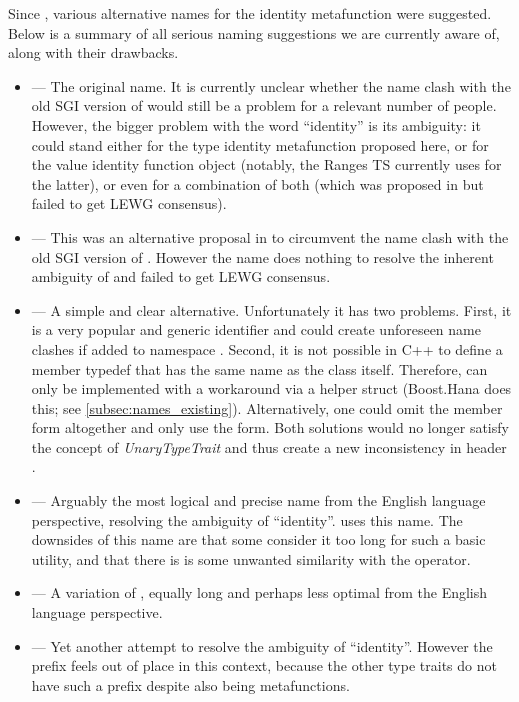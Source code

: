 Since \cite{N3766}, various alternative names for the identity metafunction were suggested. Below is a summary of all serious naming suggestions we are currently aware of, along with their drawbacks.
\begin{itemize}
\item {} --- The original name. It is currently unclear whether the name clash with the old SGI version of  would still be a problem for a relevant number of people. However, the bigger problem with the word ``identity'' is its ambiguity: it could stand either for the type identity metafunction proposed here, or for the value identity function object (notably, the Ranges TS \cite{N4685} currently uses  for the latter), or even for a combination of both (which was proposed in \cite{N3766} but failed to get LEWG consensus).
\item {} --- This was an alternative proposal in \cite{N3766} to circumvent the name clash with the old SGI version of . However the name does nothing to resolve the inherent ambiguity of  and failed to get LEWG consensus.
\item {} --- A simple and clear alternative. Unfortunately it has two problems. First, it is a very popular and generic identifier and could create unforeseen name clashes if added to namespace . Second, it is not possible in C++ to define a member typedef that has the same name as the class itself. Therefore,  can only be implemented with a workaround via a helper struct (Boost.Hana does this; see \ref{subsec:names_existing}). Alternatively, one could omit the member  form altogether and only use the  form. Both solutions would no longer satisfy the concept of \textit{UnaryTypeTrait} and thus create a new inconsistency in header .
\item {} --- Arguably the most logical and precise name from the English language perspective, resolving the ambiguity of ``identity''. \cite{Boost.TypeTraits} uses this name. The downsides of this name are that some consider it too long for such a basic utility, and that there is is some unwanted similarity with the  operator. 
\item {} --- A variation of , equally long and perhaps less optimal from the English language perspective.
\item {} --- Yet another attempt to resolve the ambiguity of ``identity''. However the prefix  feels out of place in this context, because the other type traits do not have such a prefix despite also being metafunctions.

\end{itemize}

